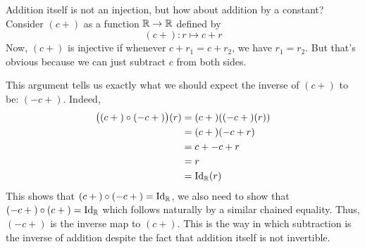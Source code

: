\begin{example}
    Addition itself is not an injection, but how about addition by a constant? Consider $(c+\phantom{})$ as a function $\mathbb{R} \to \mathbb{R}$ defined by
    \begin{equation*}
        (c+\phantom{}) \colon r \longmapsto c + r
    \end{equation*}
    Now, $(c + \phantom{})$ is injective if whenever $c + r_1 = c + r_2$, we have $r_1 = r_2$. But that's obvious because we can just subtract $c$ from both sides.

    This argument tells us exactly what we should expect the inverse of $(c + \phantom{})$ to be: $(-c + \phantom{})$. Indeed,
    \begin{align*}
        \big((c + \phantom{}) \circ (-c + \phantom{})\big)(r) &= (c + \phantom{})((-c + \phantom{})(r)) \\
        &= (c + \phantom{})(-c + r) \\
        &= c + -c + r \\
        &= r \\
        &= \operatorname{Id}_{\mathbb{R}}(r)
    \end{align*}
    This shows that $(c + \phantom{}) \circ (-c + \phantom{}) = \operatorname{Id}_{\mathbb{R}}$, we also need to show that $(-c + \phantom{}) \circ (c + \phantom{}) = \operatorname{Id}_{\mathbb{R}}$ which follows naturally by a similar chained equality. Thus, $(-c + \phantom{})$ is the inverse map to $(c + \phantom{})$.
    This is the way in which subtraction is the inverse of addition despite the fact that addition itself is not invertible.
\end{example}

